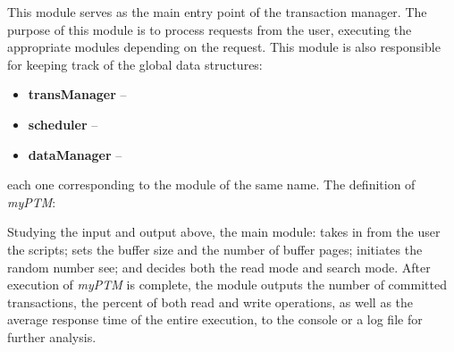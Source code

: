 This module serves as the main entry point of the transaction manager. The purpose of this module is to process requests from the user, executing the appropriate modules depending on the request. This module is also responsible for keeping track of the global data structures:

\begin{itemize}
 \item \textbf{transManager} --
 \item \textbf{scheduler} -- 
 \item  \textbf{dataManager} --
 \end{itemize}

each one corresponding to the module of the same name. The definition of \textit{myPTM}:\\

\noindent{}


Studying the input and output above, the main module: takes in from the user the scripts; sets the buffer size and the number of buffer pages; initiates the random number see; and decides both the read mode and search mode. After execution of \textit{myPTM} is complete, the module outputs the number of committed transactions, the percent of both read and write operations, as well as the average response time of the entire execution, to the console or a log file for further analysis.